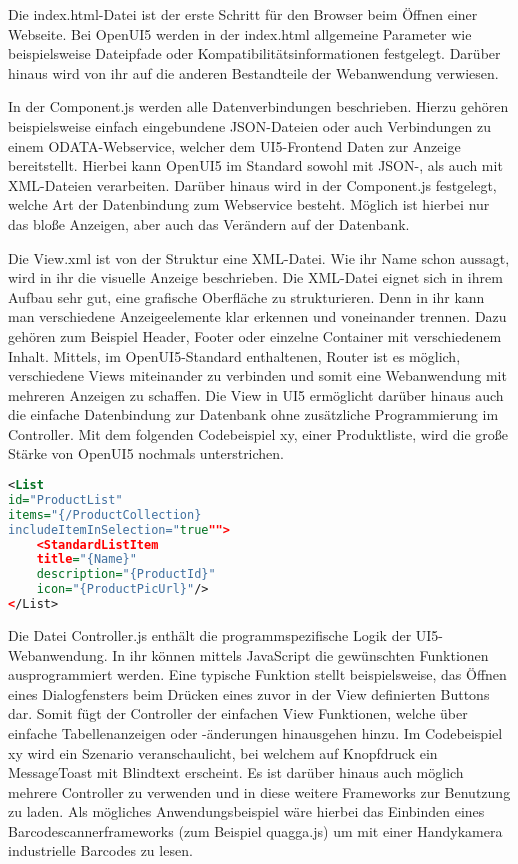Die index.html-Datei ist der erste Schritt für den Browser beim Öffnen einer Webseite. Bei OpenUI5 werden in der index.html allgemeine Parameter wie beispielsweise Dateipfade oder Kompatibilitätsinformationen festgelegt. Darüber hinaus wird von ihr auf die anderen Bestandteile der Webanwendung verwiesen.

In der Component.js werden alle Datenverbindungen beschrieben. Hierzu gehören beispielsweise einfach eingebundene JSON-Dateien oder auch Verbindungen zu einem ODATA-Webservice, welcher dem UI5-Frontend Daten zur Anzeige bereitstellt. Hierbei kann OpenUI5 im Standard sowohl mit JSON-, als auch mit XML-Dateien verarbeiten. Darüber hinaus wird in der Component.js festgelegt, welche Art der Datenbindung zum Webservice besteht. Möglich ist hierbei nur das bloße Anzeigen, aber auch das Verändern auf der Datenbank.

Die View.xml ist von der Struktur eine XML-Datei. Wie ihr Name schon aussagt, wird in ihr die visuelle Anzeige beschrieben. Die XML-Datei eignet sich in ihrem Aufbau sehr gut, eine grafische Oberfläche zu strukturieren. Denn in ihr kann man verschiedene Anzeigeelemente klar erkennen und voneinander trennen. Dazu gehören zum Beispiel Header, Footer oder einzelne Container mit verschiedenem Inhalt. Mittels, im OpenUI5-Standard enthaltenen, Router ist es möglich, verschiedene Views miteinander zu verbinden und somit eine Webanwendung mit mehreren Anzeigen zu schaffen. Die View in UI5 ermöglicht darüber hinaus auch die einfache Datenbindung zur Datenbank ohne zusätzliche Programmierung im Controller. Mit dem folgenden Codebeispiel xy, einer Produktliste, wird die große Stärke von OpenUI5 nochmals unterstrichen.

\begin{lstlisting}[caption=Beispiel OpenUI5 View, label=lst:UI5View, language=XML]
<List
id="ProductList"
items="{/ProductCollection}
includeItemInSelection="true"">
	<StandardListItem
	title="{Name}"
	description="{ProductId}"
	icon="{ProductPicUrl}"/>
</List>
\end{lstlisting}

Die Datei Controller.js enthält die programmspezifische Logik der UI5-Webanwendung. In ihr können mittels JavaScript die gewünschten Funktionen ausprogrammiert werden. Eine typische Funktion stellt beispielsweise, das Öffnen eines Dialogfensters beim Drücken eines zuvor in der View definierten Buttons dar. Somit fügt der Controller der einfachen View Funktionen, welche über einfache Tabellenanzeigen oder -änderungen hinausgehen hinzu. Im Codebeispiel xy wird ein Szenario veranschaulicht, bei welchem auf Knopfdruck ein MessageToast mit Blindtext erscheint. Es ist darüber hinaus auch möglich mehrere Controller zu verwenden und in diese weitere Frameworks zur Benutzung zu laden. Als mögliches Anwendungsbeispiel wäre hierbei das Einbinden eines Barcodescannerframeworks (zum Beispiel quagga.js) um mit einer Handykamera industrielle Barcodes zu lesen. 

